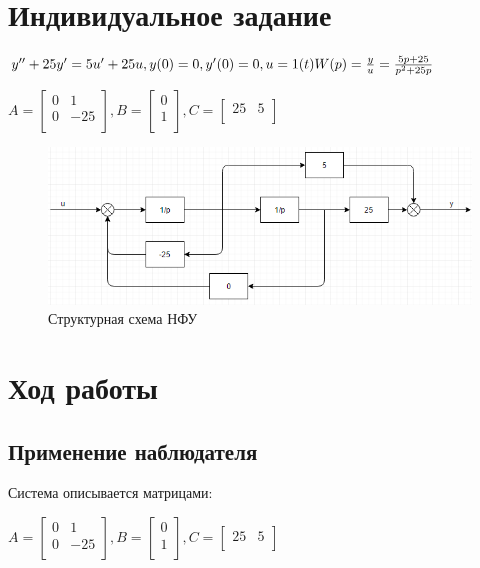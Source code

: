 \documentclass[14pt,a4paper,report]{report}
\begin{document}
\section{Индивидуальное задание}

$
\\
y''+25y'=5u'+25u, y(0)=0, y'(0)=0, u=1(t)\\\\
W(p)=\frac{y}{u}=\frac{5p+25}{p^2+25p} \\
$

$A=
\begin{bmatrix}
0 & 1 \\
0 & -25 \\
\end{bmatrix}
, B=
\begin{bmatrix}
0 \\
1 \\
\end{bmatrix}
, C=
\begin{bmatrix}
25 & 5 \\
\end{bmatrix}
$

\begin{figure}[h!]
	\centering
	\includegraphics[scale = 0.78]{images/nfu.png}
	\caption{Структурная схема НФУ}
	\label{image:1}
\end{figure}

\clearpage

\section{Ход работы}

\subsection{Применение наблюдателя}

Система описывается матрицами:

$A=
\begin{bmatrix}
0 & 1 \\
0 & -25 \\
\end{bmatrix}
, B=
\begin{bmatrix}
0 \\
1 \\
\end{bmatrix}
, C=
\begin{bmatrix}
25 & 5 \\
\end{bmatrix}
$
\end{document}
